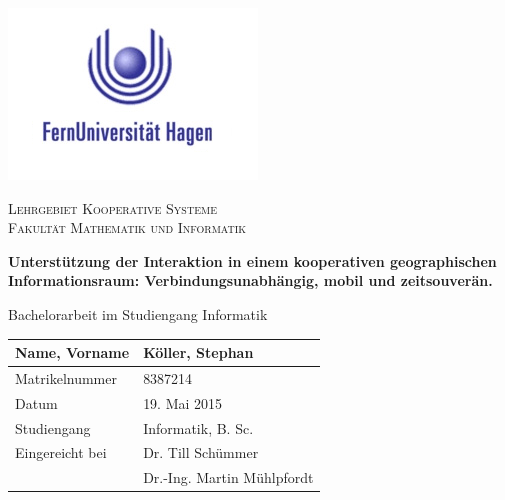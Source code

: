 \thispagestyle{empty}
\vspace{3cm}
  \begin{center}
	

  \includegraphics[scale=0.8]{bilder/fernuni-logo.png}\\ \vspace{0.8cm}

  \scshape Lehrgebiet Kooperative Systeme\\
  \scshape Fakultät Mathematik und Informatik
  \vspace{1cm}

  \bfseries{\Large{Unterstützung der Interaktion in einem kooperativen geographischen Informationsraum: Verbindungsunabhängig, mobil und zeitsouverän.
}}

  \vspace{2cm}

	Bachelorarbeit im Studiengang Informatik %

  \vspace{4cm}
  \renewcommand{\arraystretch}{1.5}
	\begin{table}[ht!]
		\centering
		\begin{tabulary}{\columnwidth}{|L|L|}
		\hline
			Name, Vorname & Köller, Stephan\\ \hline
			Matrikelnummer & 8387214\\ \hline
			Datum & 19. Mai 2015\\ \hline
			Studiengang & Informatik, B. Sc.\\ \hline
			Eingereicht bei & Dr. Till Schümmer\\
			& Dr.-Ing. Martin Mühlpfordt\\ \hline
		\end{tabulary}
	\end{table}

  \end{center}

